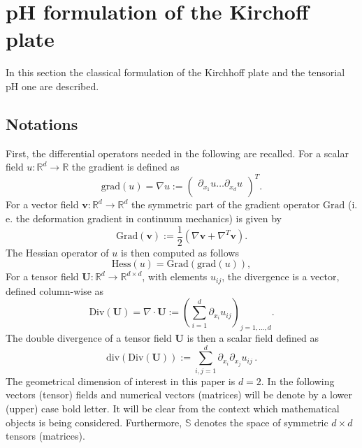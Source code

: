 \documentclass[letterpaper, 10 pt, conference]{ieeeconf}
\begin{document}
\section{pH formulation of the Kirchoff plate}
\label{sec:KirchhPH}

In this section the classical formulation of the Kirchhoff plate and the tensorial pH one are described. 

\subsection{Notations}
First, the differential operators needed in the following are recalled. For a scalar field $u: \mathbb{R}^d \rightarrow \mathbb{R}$ the gradient is defined as 
\begin{equation*}
\mathrm{grad}(u) =  \nabla u := \begin{pmatrix}
\partial_{x_1} u \dots \partial_{x_d} u \\
\end{pmatrix}^T.
\end{equation*}
For a vector field $\bm{v}: \mathbb{R}^d \rightarrow \mathbb{R}^d$ the symmetric part of the gradient operator $\mathrm{Grad}$ (i. e. the deformation gradient in continuum mechanics) is given by
\begin{equation*}
\mathrm{Grad}(\bm{v}) := \frac{1}{2} \left(\nabla \bm{v} + \nabla^T \bm{v} \right).
\end{equation*}
The Hessian operator of $u$ is then computed as follows
\begin{equation*}
\mathrm{Hess}(u) = \mathrm{Grad}(\mathrm{grad}(u)),
\end{equation*}
For a tensor field $\bm{U}: \mathbb{R}^d \rightarrow \mathbb{R}^{d \times d}$, with elements $u_{ij}$, the divergence is a vector, defined column-wise as
\begin{equation*}
\mathrm{Div}(\bm U) = \nabla \cdot \bm{U} := \left( \sum_{i = 1}^d \partial_{x_i} u_{ij} \right)_{j = 1, \dots, d}.
\end{equation*}
The double divergence of a tensor field $\bm{U}$ is then a scalar field defined as
\begin{equation*}
\mathrm{div}(\mathrm{Div}(\bm U)):= \sum_{i, j = 1}^d \partial_{x_i} \partial_{x_j} u_{ij} \, .
\end{equation*}
The geometrical dimension of interest in this paper is $d=2$. In the following vectors (tensor) fields and numerical vectors (matrices) will be denote by a lower (upper) case bold letter. It will be clear from the context which mathematical objects is being considered. Furthermore, $\mathbb{S}$ denotes the space of symmetric $d \times d$ tensors (matrices).
\end{document}
